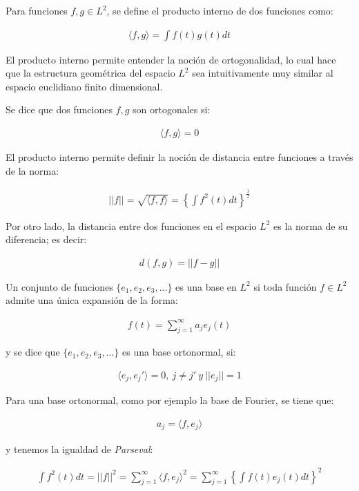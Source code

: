 \documentclass[
]{book}
\begin{document}
Para funciones \(f,g\in L^2\), se define el producto interno de dos funciones como:

\begin{align}
    \langle f,g \rangle=\int f(t)g(t)dt
\end{align}

El producto interno permite entender la noción de ortogonalidad, lo cual hace que la estructura geométrica del espacio \(L^2\) sea intuitivamente muy similar al espacio euclidiano finito dimensional.

Se dice que dos funciones \(f,g\) son ortogonales si:

\begin{align}
    \langle f,g \rangle=0
\end{align}

El producto interno permite definir la noción de distancia entre funciones a través de la norma:

\begin{align}
  ||f||=\sqrt{\langle f,f \rangle}=\left\{\int f^2 (t) dt \right\}^{\frac{1}{2}}
\end{align}

Por otro lado, la distancia entre dos funciones en el espacio \(L^2\) es la norma de su diferencia; es decir:

\begin{align}
    d(f,g)=||f-g||
\end{align}

Un conjunto de funciones \(\{e_1,e_2,e_3,...\}\) es una base en \(L^2\) si toda función \(f\in L^2\) admite una única expansión de la forma:

\begin{align}
    f(t)=\sum_{j=1}^\infty {a_je_j(t)}
\end{align}

y se dice que \(\{e_1,e_2,e_3,...\}\) es una base ortonormal, si:

\begin{align}
    \langle e_j,e_j' \rangle =0,\ j\neq j' \ y\ ||e_j||=1
\end{align}

Para una base ortonormal, como por ejemplo la base de Fourier, se tiene que:

\begin{align}
    a_j=\langle f,e_j \rangle
\end{align}

y tenemos la igualdad de \emph{Parseval}:

\begin{align}
    \int f^2 (t) dt = ||f||^2 = \sum_{j=1}^{\infty} {\langle f,e_j \rangle ^2} = \sum_{j=1}^{\infty} \left\{\int f(t)e_{j}(t) dt\right\}^2
\end{align}
\end{document}
